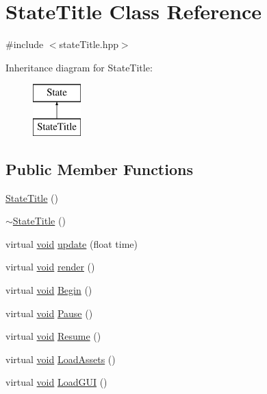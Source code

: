 \hypertarget{class_state_title}{\section{State\-Title Class Reference}
\label{class_state_title}
}


{\ttfamily \#include $<$state\-Title.\-hpp$>$}

Inheritance diagram for State\-Title\-:\begin{figure}[H]
\begin{center}
\leavevmode
\includegraphics[height=2.000000cm]{class_state_title}
\end{center}
\end{figure}
\subsection*{Public Member Functions}
\begin{DoxyCompactItemize}
\item 
\hyperlink{class_state_title_a407ffed9ae4da48c523d12a81efef8df}{State\-Title} ()
\item 
\hyperlink{class_state_title_a4b93c048c51629ac060a7a04fce14f08}{$\sim$\-State\-Title} ()
\item 
virtual \hyperlink{_s_d_l__opengles2__gl2ext_8h_ae5d8fa23ad07c48bb609509eae494c95}{void} \hyperlink{class_state_title_a407820de3e95376a459db406ebde34f2}{update} (float time)
\item 
virtual \hyperlink{_s_d_l__opengles2__gl2ext_8h_ae5d8fa23ad07c48bb609509eae494c95}{void} \hyperlink{class_state_title_a4a967bd487216860a8d0ca6a34a334c2}{render} ()
\item 
virtual \hyperlink{_s_d_l__opengles2__gl2ext_8h_ae5d8fa23ad07c48bb609509eae494c95}{void} \hyperlink{class_state_title_aaee854dfe8461f07f560976cfa4f0338}{Begin} ()
\item 
virtual \hyperlink{_s_d_l__opengles2__gl2ext_8h_ae5d8fa23ad07c48bb609509eae494c95}{void} \hyperlink{class_state_title_ac1a402cdf5fbd2a7035ee0367fb2c79f}{Pause} ()
\item 
virtual \hyperlink{_s_d_l__opengles2__gl2ext_8h_ae5d8fa23ad07c48bb609509eae494c95}{void} \hyperlink{class_state_title_acb25d1aed1f0c5474a4d71da45026ca5}{Resume} ()
\item 
virtual \hyperlink{_s_d_l__opengles2__gl2ext_8h_ae5d8fa23ad07c48bb609509eae494c95}{void} \hyperlink{class_state_title_a5784cb5fe5b9873d1ed2daf6c8875e1c}{Load\-Assets} ()
\item 
virtual \hyperlink{_s_d_l__opengles2__gl2ext_8h_ae5d8fa23ad07c48bb609509eae494c95}{void} \hyperlink{class_state_title_ad4547b2fa21aa4767ce943259c122f08}{Load\-G\-U\-I} ()
\end{DoxyCompactItemize}
